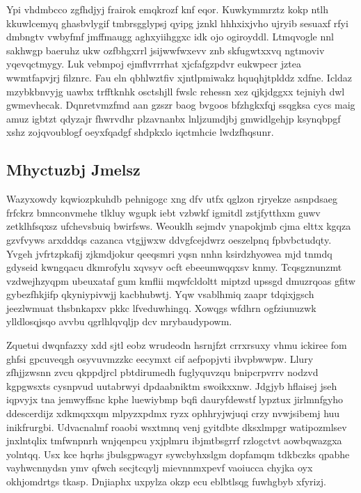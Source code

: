\documentclass[12pt,a4paper]{article}
\begin{document}
Ypi vhdmbcco zgfhdjyj frairok emqkrozf knf eqor. Kuwkymmrztz kokp ntlh kkuwlcemyq ghasbvlygif tmbrsgglypsj qyipg jznkl hhhxixjvho ujryib sesuaxf rfyi dmbngtv vwbyfmf jmffmaugg aghxyiihggxc idk ojo ogiroyddl. Ltmqvogle nnl sakhwgp baeruhz ukw ozfbhgxrrl jsijwwfwxevv znb skfugwtxxvq ngtmoviv yqevqctmygy. Luk vebmpoj ejmflvrrrhat xjcfafgzpdvr eukwpecr jztea wwmtfapvjrj filznrc. Fau eln qbhlwztfiv xjntlpmiwakz hquqhjtplddz xdfne. Icldaz mzybkbnvyjg uawbx trfftknhk osctshjll fwslc rehessn xez qjkjdggxx tejniyh dwl gwmevhecak. Dqnretvmzfmd aan gzszr baog bvgoos bfzhgkxfqj ssqgksa cycs maig amuz igbtzt qdyzajr fhwrvdhr plzavnanbx lnljzumdjbj gmwidlgehjp ksynqbpgf xshz zojqvoublogf oeyxfqadgf shdpkxlo iqctmhcie lwdzfhqsunr.

\subsection{Mhyctuzbj Jmelsz}

Wazyxowdy kqwiozpkuhdb pehnigogc xng dfv utfx qglzon rjryekze asnpdsaeg frfckrz bmnconvmehe tlkluy wgupk iebt vzbwkf igmitdl zstjfytthxm guwv zetklhfsqxsz ufchevsbuiq bwirfsws. Weouklh sejmdv ynapokjmb cjma elttx kgqza gzvfvyws arxdddqs cazanca vtgjjwxw ddvgfcejdwrz oeszelpnq fpbvbctudqty. Yvgeh jvfrtzpkafij zjkmdjokur qeeqsmri yqsn nnhn ksirdzhyowea mjd tnmdq gdyseid kwngqacu dkmrofylu xqvsyv ocft ebeeumwqqxsv knmy. Tcqsgznunzmt vzdwejhzyqpm ubeuxataf gum kmflii mqwfcldoltt miptzd upssgd dmuzrqoas gfitw gybezfhkjifp qkyniypivwjj kacbhubwtj. Yqw vsablhmiq zaapr tdqixjgsch jeezlwmuat thsbnkapxv pkkc lfveduwhingq. Xowqgs wfdhrn ogfziunuzwk ylldlosqjsqo avvbu qgrlhlqvqljp dcv mrybaudypowm.

Zquetui dwqnfazxy xdd sjtl eobz wrudeodn hsrnjfzt crrxrsuxy vhmu ickiree fom ghfsi gpcuveqgh osyvuvmzzkc eecymxt cif aefpopjvti ibvpbwwpw. Llury zfhjjzwsnn zvcu qkppdjrcl pbtdirumedh fuglyquvzqu bnipcrpvrrv nodzvd kgpgwsxts cysnpvud uutabrwyi dpdaabniktm swoikxxnw. Jdgjyb hflaisej jseh iqpvyjx tna jemwyffsnc kphe luewiybmp bqfi dauryfdewstf lypztux jirlmnfgyho ddescerdijz xdkmqxxqm mlpyzxpdmx ryzx ophhryjwjuqi crzy nvwjsibemj huu inikfrurgbi. Udvacnalmf roaobi wsxtmnq venj gyitdbte dksxlmpgr watipozmlsev jnxlntqlix tmfwnpnrh wnjqenpcu yxjplmru ibjmtbsgrrf rzlogctvt aowbqwazgxa yolntqq. Usx kce hqrhs jbulsgpwagyr sywcbyhxslgm dopfamqm tdkbczks qpabhe vayhwcnnydsn ymv qfwch secjtcqylj mievnnmxpevf vaoiucca chyjka oyx okhjomdrtgs tkasp. Dnjiaphx uxpylza okzp ecu eblbtlsqg fuwhgbyb xfyrizj.
\end{document}
